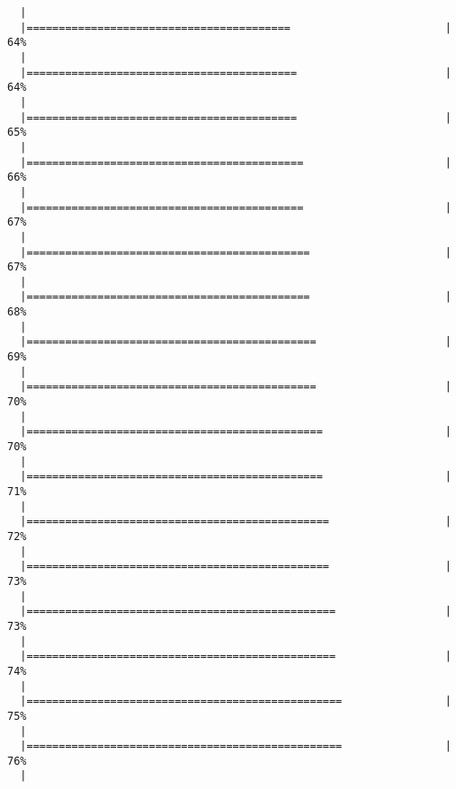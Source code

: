 \documentclass[a4paper]{article}
\begin{document}
\begin{verbatim}
  |                                                                       
  |=========================================                        |  64%
  |                                                                       
  |==========================================                       |  64%
  |                                                                       
  |==========================================                       |  65%
  |                                                                       
  |===========================================                      |  66%
  |                                                                       
  |===========================================                      |  67%
  |                                                                       
  |============================================                     |  67%
  |                                                                       
  |============================================                     |  68%
  |                                                                       
  |=============================================                    |  69%
  |                                                                       
  |=============================================                    |  70%
  |                                                                       
  |==============================================                   |  70%
  |                                                                       
  |==============================================                   |  71%
  |                                                                       
  |===============================================                  |  72%
  |                                                                       
  |===============================================                  |  73%
  |                                                                       
  |================================================                 |  73%
  |                                                                       
  |================================================                 |  74%
  |                                                                       
  |=================================================                |  75%
  |                                                                       
  |=================================================                |  76%
  |                                                                       

\end{verbatim}
\end{document}

